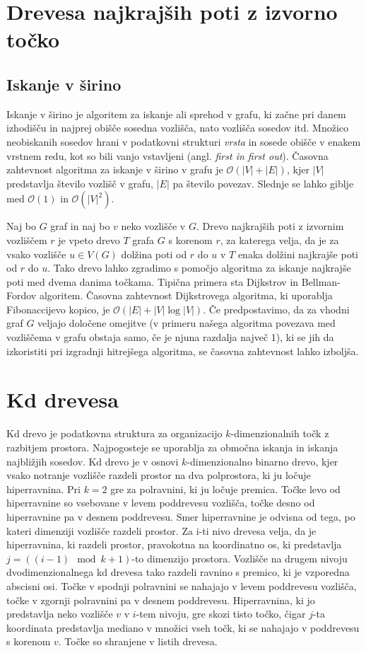 \documentclass[a4paper, 12pt]{book}
\newcommand{\OO}{\ensuremath{\mathcal{O}}} %
\begin{document}
\section{Drevesa najkrajših poti z izvorno točko}
\subsection*{Iskanje  v širino}
Iskanje v širino je algoritem za iskanje ali sprehod v grafu, ki začne pri danem izhodišču in najprej obišče sosedna vozlišča, nato vozlišča sosedov itd. Množico neobiskanih sosedov hrani v podatkovni strukturi \textit{vrsta} in sosede obišče v enakem vrstnem redu, kot so bili vanjo vstavljeni (angl. \textit{first in first out}). Časovna zahtevnost algoritma za iskanje v širino v grafu je $\OO(|V| + |E|)$, kjer $|V|$ predstavlja število vozlišč v grafu, $|E|$ pa število povezav. Slednje se lahko giblje med $\OO(1)$ in $\OO(|V|^2)$.

\bigbreak
Naj bo $G$ graf in naj bo $v$ neko vozlišče v $G$.
Drevo najkrajših poti z izvornim vozliščem $r$ je vpeto drevo $T$ grafa $G$ s korenom $r$, za katerega velja, da je za vsako vozlišče $u\in V(G)$ dolžina poti od $r$ do $u$ v $T$ enaka dolžini najkrajše poti od $r$ do $u$. Tako drevo lahko zgradimo s pomočjo algoritma za iskanje najkrajše poti med dvema danima točkama. Tipična primera sta Dijkstrov in Bellman-Fordov algoritem. Časovna zahtevnost Dijkstrovega algoritma, ki uporablja Fibonaccijevo kopico, je $\OO(|E|+|V|\log |V|)$. Če predpostavimo, da za vhodni graf $G$ veljajo določene omejitve (v primeru našega algoritma povezava med vozliščema v grafu obstaja samo, če je njuna razdalja največ 1), ki se jih da izkoristiti pri izgradnji hitrejšega algoritma, se časovna zahtevnost lahko izboljša.

\section{Kd drevesa}

Kd drevo je podatkovna struktura za organizacijo $k$-dimenzionalnih točk z razbitjem prostora. Najpogosteje se uporablja za območna iskanja in iskanja najbližjih sosedov.
Kd drevo je v osnovi $k$-dimenzionalno binarno drevo, kjer vsako notranje vozlišče razdeli prostor na dva polprostora, ki ju ločuje hiperravnina. Pri $k=2$ gre za polravnini, ki ju ločuje premica. Točke levo od hiperravnine so vsebovane v levem poddrevesu vozlišča, točke desno od hiperravnine pa v desnem poddrevesu. Smer hiperravnine je odvisna od tega, po kateri dimenziji vozlišče razdeli prostor.
Za i-ti nivo drevesa velja, da je hiperravnina, ki razdeli prostor, pravokotna na koordinatno os, ki predstavlja $j = ((i-1)\mod k + 1)$-to dimenzijo prostora. Vozlišče na drugem nivoju dvodimenzionalnega kd drevesa tako razdeli
ravnino s premico, ki je vzporedna abscisni osi. Točke v spodnji polravnini se nahajajo v levem poddrevesu vozlišča, točke v zgornji polravnini pa v desnem poddrevesu. Hiperravnina, ki jo predstavlja neko vozlišče $v$ v $i$-tem nivoju,
gre skozi tisto točko, čigar $j$-ta koordinata predstavlja mediano v množici vseh točk, ki se nahajajo v poddrevesu s korenom $v$. Točke so shranjene v listih drevesa.
\end{document}
